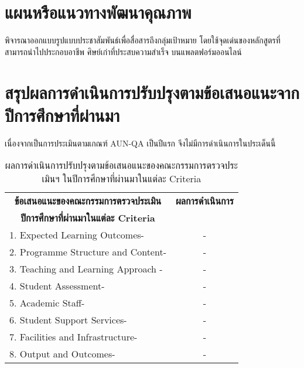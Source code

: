 \section{แผนหรือแนวทางพัฒนาคุณภาพ}
พิจารณาออกแบบรูปแบบประชาสัมพันธ์เพื่อสื่อสารถึงกลุ่มเป้าหมาย โดยใช้จุดเด่นของหลักสูตรที่สามารถนำไปประกอบอาชีพ ศิษย์เก่าที่ประสบความสำเร็จ บนแพลตฟอร์มออนไลน์

\section{สรุปผลการดำเนินการปรับปรุงตามข้อเสนอแนะจากปีการศึกษาที่ผ่านมา}
เนื่องจากเป็นการประเมินตามเกณฑ์ AUN-QA เป็นปีแรก จึงไม่มีการดำเนินการในประเด็นนี้
\begin{longtable}{|p{}|c|}
\caption{ผลการดำเนินการปรับปรุงตามข้อเสนอแนะของคณะกรรมการตรวจประเมินฯ ในปีการศึกษาที่ผ่านมาในแต่ละ Criteria}	
\\
\hline
	\multicolumn{1}{|c|}{\textbf{ข้อเสนอแนะของคณะกรรมการตรวจประเมิน}}
	&\multicolumn{1}{c|}{\bf ผลการดำเนินการ}\\
	\multicolumn{1}{|c|}{\textbf{ปีการศึกษาที่ผ่านมาในแต่ละ Criteria}}&\\\hline
\endhead
	1. Expected Learning Outcomes\newline-&-\\\hline
	2. Programme Structure and Content\newline-&-\\\hline
	3. Teaching and Learning Approach
\newline-&-\\\hline
4. Student Assessment\newline-&-\\\hline
5. Academic Staff\newline-&-\\\hline
6. Student Support Services\newline-&-\\\hline
7. Facilities and Infrastructure\newline-&-\\\hline
8. Output and Outcomes\newline-&-\\\hline
	 \end{longtable}


